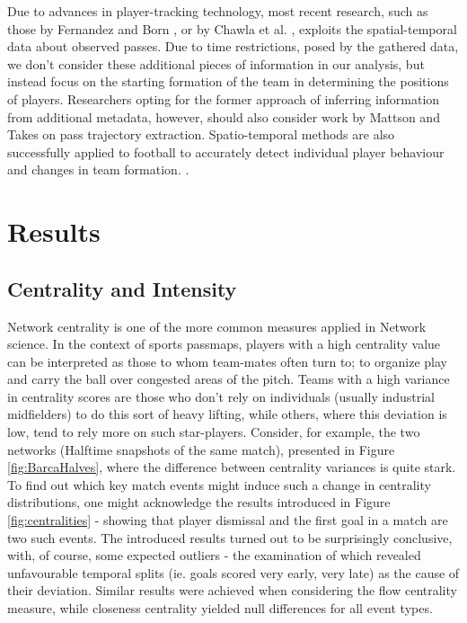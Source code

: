 \documentclass[9pt,twocolumn,twoside]{pnas-report}
\begin{document}
Due to advances in player-tracking technology, most recent research, such as those by Fernandez and Born \cite{fbrn}, or by Chawla et al. \cite{chawla}, exploits the spatial-temporal data about observed passes. Due to time restrictions, posed by the gathered data, we don't consider these additional pieces of information in our analysis, but instead focus on the starting formation of the team in determining the positions of players. Researchers opting for the former approach of inferring information from additional metadata, however, should also consider work by Mattson and Takes \cite{trajectory} on pass trajectory extraction. Spatio-temporal methods are also successfully applied to football to accurately detect individual player behaviour and changes in team formation. \cite{bialkowski2014large}.

\section*{Results}

\subsection*{Centrality and Intensity}
Network centrality is one of the more common measures applied in Network science. In the context of sports passmaps, players with a high centrality value can be interpreted as those to whom team-mates often turn to; to organize play and carry the ball over congested areas of the pitch. Teams with a high variance in centrality scores are those who don't rely on individuals (usually industrial midfielders) to do this sort of heavy lifting, while others, where this deviation is low, tend to rely more on such star-players. Consider, for example, the two networks (Halftime snapshots of the same match), presented in Figure \ref{fig:BarcaHalves}, where the difference between centrality variances is quite stark. To find out which key match events might induce such a change in centrality distributions, one might acknowledge the results introduced in Figure \ref{fig:centralities} - showing that player dismissal and the first goal in a match are two such events. The introduced results turned out to be surprisingly conclusive, with, of course, some expected outliers - the examination of which revealed unfavourable temporal splits (ie. goals scored very early, very late) as the cause of their deviation. Similar results were achieved when considering the flow centrality measure, while closeness centrality yielded null differences for all event types. 
\end{document}
